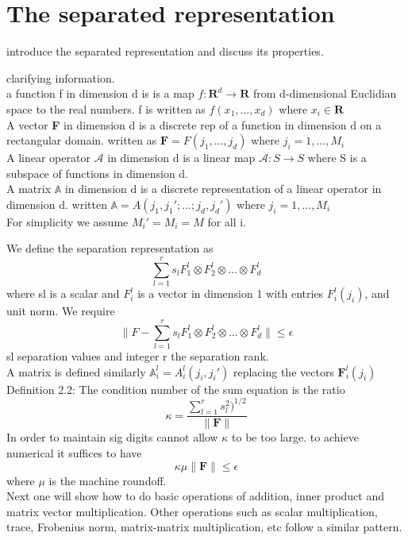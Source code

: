 \documentclass[10pt, draft]{article}
\begin{document}
 
 \section{The separated representation}
 \begin{center}
 introduce the separated representation and discuss its properties. 
 \end{center}

 clarifying information. \\
 a function f in dimension d is is a map $f : \textbf{R}^d \rightarrow \textbf{R} $ from d-dimensional Euclidian space to the real numbers.  f is written as $f(x_1, ...,x_d) $ where $x_i \in \textbf{R}$\\
 A vector \textbf{F} in dimension d is a discrete rep of a function in dimension d on a rectangular domain. written as $\textbf{F} = F(j_1,...,j_d)$ where $j_i = 1,...,M_i$ \\
 A linear operator $\mathcal{A}$ in dimension d is a linear map $\mathcal{A} : S \rightarrow S $ where S is a subspace of functions in dimension d.\\
 A matrix $\mathbb{A}$ in dimension d is a discrete representation of a linear operator in dimension d. written $\mathbb{A} = A(j_1, j_1';...;j_d,j_d') $ where $j_i = 1,...,M_i$ \\
 For simplicity we assume $M_i' = M_i = M$ for all i.\linebreak[1]
 
 We define the separation representation as 
 \[ \sum_{l=1}^r s_l F_1^l \otimes F_2^l \otimes ... \otimes F_d^l \]
 where sl is a scalar and $F_i^l$ is a vector in dimension 1 with entries $F_i^l(j_i)$, and unit norm.  We require 
 \[ \| F- \sum_{l=1}^r s_l  F_1^l \otimes F_2^l \otimes ... \otimes F_d^l \| \leq \epsilon \]
 sl separation values and integer r the separation rank.\\
 
 A matrix is defined similarly $\mathbb{A}_i^l = A_i^l(j_i,j_i')$ replacing the vectors $\textbf{F}_i^l(j_i)$\\
 Definition 2.2: The condition number of  the sum equation is the ratio 
 \[\kappa = \frac{\sum_{l=1}^r s_l^2)^{1/2}}{\|\textbf{F}\|} \]
 In order to maintain sig digits cannot allow $\kappa$ to be too large. to achieve numerical it suffices to have 
 \[\kappa\mu\|\textbf{F}\| \leq \epsilon\]
 where $\mu$ is the machine roundoff.\\
 Next one will show how to do basic operations of addition, inner product and matrix vector multiplication.  Other operations such as scalar multiplication, trace, Frobenius norm, matrix-matrix multiplication, etc follow a similar pattern.  \linebreak[1]
 
\end{document}
